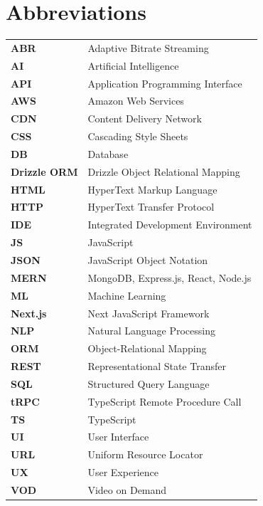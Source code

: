 \chapter*{Abbreviations}

\begin{longtable}{@{}l@{\hspace{2em}}l@{}}
\textbf{ABR} & Adaptive Bitrate Streaming \\
\textbf{AI} & Artificial Intelligence \\
\textbf{API} & Application Programming Interface \\
\textbf{AWS} & Amazon Web Services \\
\textbf{CDN} & Content Delivery Network \\
\textbf{CSS} & Cascading Style Sheets \\
\textbf{DB} & Database \\
\textbf{Drizzle ORM} & Drizzle Object Relational Mapping \\
\textbf{HTML} & HyperText Markup Language \\
\textbf{HTTP} & HyperText Transfer Protocol \\
\textbf{IDE} & Integrated Development Environment \\
\textbf{JS} & JavaScript \\
\textbf{JSON} & JavaScript Object Notation \\
\textbf{MERN} & MongoDB, Express.js, React, Node.js \\
\textbf{ML} & Machine Learning \\
\textbf{Next.js} & Next JavaScript Framework \\
\textbf{NLP} & Natural Language Processing \\
\textbf{ORM} & Object-Relational Mapping \\
\textbf{REST} & Representational State Transfer \\
\textbf{SQL} & Structured Query Language \\
\textbf{tRPC} & TypeScript Remote Procedure Call \\
\textbf{TS} & TypeScript \\
\textbf{UI} & User Interface \\
\textbf{URL} & Uniform Resource Locator \\
\textbf{UX} & User Experience \\
\textbf{VOD} & Video on Demand \\
\end{longtable}
